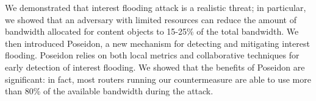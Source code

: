 \documentclass[10pt,conference,letterpaper]{IEEEtran}
\begin{document}
We demonstrated that interest flooding attack is a realistic threat; in particular, we showed that an adversary with limited resources can reduce the amount of  bandwidth allocated for content objects to 15-25\% of the total bandwidth.
We then introduced Poseidon, a new mechanism for detecting and mitigating interest flooding. 
Poseidon relies on both local metrics and collaborative techniques for early detection of interest flooding.
We showed that the benefits of Poseidon are significant: in fact, most routers running our countermeasure are able to use more than 80\% of the available bandwidth during the attack.
\vspace{0.5cm}







\balance

{

}
\end{document}
